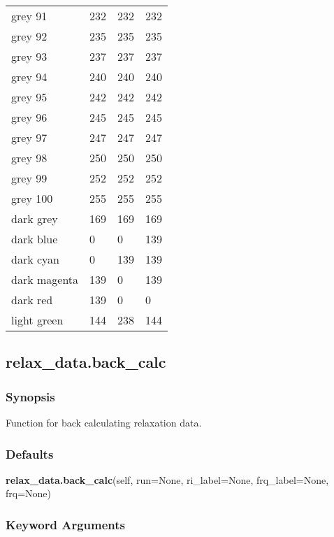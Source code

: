 \begin{center}
\begin{tabular}{llll}
  grey 91 & 232 & 232 & 232  \\
  grey 92 & 235 & 235 & 235  \\
  grey 93 & 237 & 237 & 237  \\
  grey 94 & 240 & 240 & 240  \\
  grey 95 & 242 & 242 & 242  \\
  grey 96 & 245 & 245 & 245  \\
  grey 97 & 247 & 247 & 247  \\
  grey 98 & 250 & 250 & 250  \\
  grey 99 & 252 & 252 & 252  \\
  grey 100 & 255 & 255 & 255  \\
  dark grey & 169 & 169 & 169  \\
  dark blue & 0 & 0 & 139  \\
  dark cyan & 0 & 139 & 139  \\
  dark magenta & 139 & 0 & 139  \\
  dark red & 139 & 0 & 0  \\
  light green & 144 & 238 & 144  \\
 \bottomrule 
 \end{tabular} 
 \end{center} 
  

  

 \newpage 

 \subsection{relax\_data.back\_calc} 

  
 \subsubsection{Synopsis} 

 Function for back calculating relaxation data. 
  

  
 \subsubsection{Defaults} 

 \textsf{\textbf{relax\_data.back\_calc}(self, run=None, ri\_label=None, frq\_label=None, frq=None)} 

  
 \subsubsection{Keyword Arguments} 


